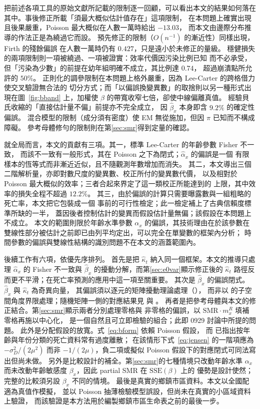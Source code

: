 \documentclass[UTF8, fontset=macnew, a4paper, 12pt]{ctexart}
\begin{document}
把前述各項工具的原始文獻所記載的限制逐一回顧，可以看出本文的結果如何落在
其中。事後修正所載「須最大概似估計值存在」這項限制，
在本問題上確實出現且後果嚴重，Poisson 最大概似在人數一萬時給出 $-13.03$，
而本文由邊際分布推導的作法正是為繞過它而設。
預先修正的限制（$O(n^{-1})$ 的漸近性）同樣出現，Firth 的殘餘偏誤
在人數一萬時仍有 $0.427$，只是遠小於未修正的量級。
穩健損失的兩項限制則一項被繞過、一項被證實：效率代價因污染比例已知
而不必承受，但「污染為少數」的前提在幼年組明確不成立，其比例達 $0.74$，
超過崩潰點所允許的 $50\%$。
正則化的調參限制在本問題上格外嚴重，因為 Lee-Carter 的跨格借力使交叉驗證無合法的
切分方式；而「以偏誤換變異數」的取捨則以另一種形式出現在圖~\ref{fig:bband}
上，加權使 $\beta$ 的帶寬收窄七倍，卻使中線偏離真值。
經驗貝氏收縮的「直接估計量不偏」前提亦不完全成立，
因 $\hat\beta_x$ 本身即含 $9.2\%$ 的確定性偏誤。
混合模型的限制（成分須有密度）使 EM 無從施加，但因 $\pi$ 已知而不構成障礙。
參考母體修勻的限制則在第\ref{sec:smr}得到定量的確認。

就全局而言，本文的貢獻有三項。其一，標準 Lee-Carter 的年齡參數 Fisher 不一致，
而該不一致有一般形式，其在 Poisson 之下為閉式；$\hat\alpha_x$ 的偏誤是一個
有限樣本的恆等式而非漸近近似，且不隨觀測年數增加而消失。
其二，本文導出三個二階解析量，亦即對數尺度的變異數、校正所付的變異數代價，
以及相對於 Poisson 最大概似的效率；三者合起來界定了這一類校正所能達到的
上限，其中效率的損失全程不超過 $12.2\%$。
其三，由於偏誤的計算只需要曝露數與一組粗略的死亡率，本文把它包裝成一個
事前的可行性檢定；此一檢定補上了古典信賴度標準所缺的一半，
蓋因後者控制估計的變異而假設估計量無偏；該假設在本問題上不成立。
本文的範圍則限於年齡水準參數 $\alpha_x$ 的偏誤，其技術理由在於該參數在
雙線性部分被估計之前即已由列平均定出，可以完全在單變數的框架內分析；
時間參數的偏誤與雙線性結構的識別問題不在本文的涵蓋範圍內。



後續工作有六項，依優先序排列。
首先是把 $\hat\kappa_t$ 納入同一個框架。本文的推導只處理 $\hat\alpha_x$ 的
Fisher 不一致與 $\hat\beta_x$ 的擾動分解，而第\ref{sec:e0var}顯示修正後的
$\hat\kappa_t$ 路徑反而更不平滑；在死亡率預測的應用中這一項至關重要。
其次是 $\hat\beta_x$ 的偏誤閉式。$\hat\beta_x$ 與 $\hat\kappa_t$ 為奇異向量，
其偏誤須以逐元的矩陣擾動理論處理（\citealp{abbe2020}），
而非以 \citet{caizhang2018} 的子空間角度界限處理；隨機矩陣一側的對應結果見 \citet{benaych2012} 與 \citet{zhang2022}。
再者是把參考母體與本文的修正結合。第\ref{sec:smr}顯示兩者分別處理零格與
非零格的偏誤，以 $\mathrm{SMR}\cdot m^{R}_x$ 填補零格再施以中心化，
是一個自然且可立即檢驗的組合；此即 0929 討論中所提的問題。
此外是分配假設的放寬。式~\eqref{eq:bform} 依賴 Poisson 假設，
而 \citet{djeundje2010}已指出按年齡與年份分類的死亡資料常有過度離散；
在該情形下式~\eqref{eq:jensen} 的一階項應為 $-\sigma_D^2/(2\mu^2)$
而非 $-1/(2\mu)$，負二項或擬似 Poisson 假設下的對應閉式可同法寫出但尚未做。
另外是比較設計的補全。第\ref{sec:smr}的七種情境只改動年齡水準 $\alpha_x$
而未改動年齡敏感度 $\beta_x$，因此 partial SMR 在 $\mathrm{SSE}(\beta)$ 上的
優勢是設計使然；完整的比較須另設 $\beta_x$ 不同的情境。
最後是真實的鄉鎮市區資料。本文以全國配適為真值作模擬，
並以 Poisson 抽薄檢驗模型誤設，但尚未在真實的小區域資料上驗證，
而該驗證是本方法用於編製鄉鎮市區生命表之前的最後一步。
\end{document}
